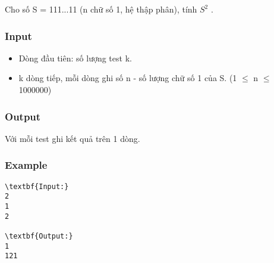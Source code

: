 

Cho số S = 111...11 (n chữ số 1, hệ thập phân), tính $S^{2}$ .

\subsubsection{Input}
\begin{itemize}
	\item Dòng đầu tiên: số lượng test k.
	\item k dòng tiếp, mỗi dòng ghi số n - số lượng chữ số 1 của S. (1  $\le$  n  $\le$  1000000)
\end{itemize}

\subsubsection{Output}

Với mỗi test ghi kết quả trên 1 dòng.

\subsubsection{Example}
\begin{verbatim}
\textbf{Input:}
2
1
2

\textbf{Output:}
1
121
\end{verbatim}
